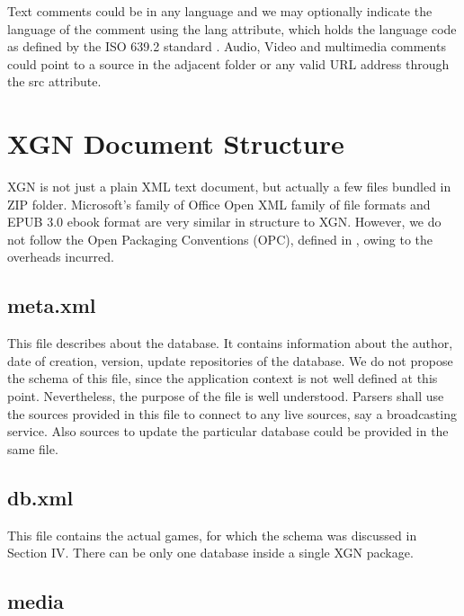 \documentclass[conference]{IEEEtran}
\begin{document}
Text comments could be in any language and we may optionally indicate the language of the comment using the lang attribute, which holds the language code as defined by the ISO 639.2 standard \cite{ab05}
. Audio, Video and multimedia comments could point to a source in the adjacent folder or any valid URL address through the src attribute.




\section{XGN \textendash  Document Structure}

XGN is not just a plain XML text document, but actually a few files bundled in ZIP folder. Microsoft's family of Office Open XML family of file formats \cite{ab06}
 and EPUB 3.0 ebook format \cite{ab07}
 are very similar in structure to XGN. However, we do not follow the Open Packaging Conventions (OPC), defined in \cite{ab06}
, owing to the overheads incurred.




\subsection{meta.xml}

This file describes about the database. It contains information about the author, date of creation, version, update repositories of the database. We do not propose the schema of this file, since the application context is not well defined at this point. Nevertheless, the purpose of the file is well understood. Parsers shall use the sources provided in this file to connect to any live sources, say a broadcasting service. Also sources to update the particular database could be provided in the same file.




\subsection{db.xml}

This file contains the actual games, for which the schema was discussed in Section IV. There can be only one database inside a single XGN package.




\subsection{media}
\end{document}
